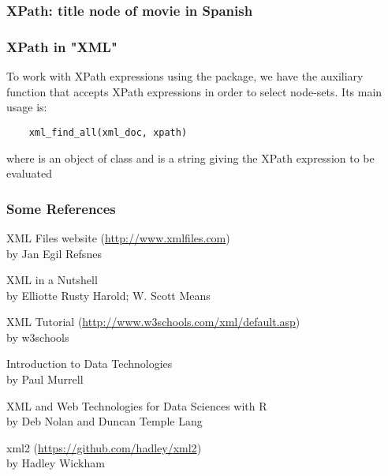\documentclass[12pt]{beamer}\usepackage[]{graphicx}\usepackage[]{color}
\begin{document}
\begin{frame}
\frametitle{XPath: title node of movie in Spanish}
\begin{center}
\end{center}
\end{frame}


\begin{frame}
\begin{center}
\Huge{}
\end{center}
\end{frame}


\begin{frame}[fragile]
\frametitle{XPath in "XML"}

To work with XPath expressions using the  package, we have the auxiliary function {\hilit {}} that accepts XPath expressions in order to 
select node-sets. Its main usage is:
\begin{verbatim}
    xml_find_all(xml_doc, xpath)
\end{verbatim}
\eb

where {\hilit {}} is an object of class  and {\hilit {}} is a string giving the XPath expression to be evaluated

\end{frame}


\begin{frame}
\frametitle{Some References}

\bi
 \item XML Files website {\scriptsize (\url{http://www.xmlfiles.com})} \\
 {\lolit by Jan Egil Refsnes}
 \item XML in a  Nutshell \\
 {\lolit by Elliotte Rusty Harold; W. Scott Means}
 \item XML Tutorial {\scriptsize (\url{http://www.w3schools.com/xml/default.asp})} \\
 {\lolit by w3schools}
 \item Introduction to Data Technologies \\
 {\lolit by Paul Murrell}
 \item XML and Web Technologies for Data Sciences with R \\
 {\lolit by Deb Nolan and Duncan Temple Lang}
 \item xml2 {\scriptsize (\url{https://github.com/hadley/xml2})} \\
 {\lolit by Hadley Wickham}
\ei

\end{frame}

\end{document}
